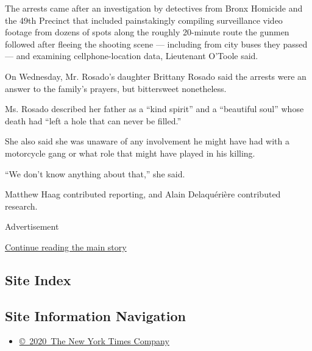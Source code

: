 The arrests came after an investigation by detectives from Bronx
Homicide and the 49th Precinct that included painstakingly compiling
surveillance video footage from dozens of spots along the roughly
20-minute route the gunmen followed after fleeing the shooting scene ---
including from city buses they passed --- and examining
cellphone-location data, Lieutenant O'Toole said.

On Wednesday, Mr. Rosado's daughter Brittany Rosado said the arrests
were an answer to the family's prayers, but bittersweet nonetheless.

Ms. Rosado described her father as a ``kind spirit'' and a ``beautiful
soul'' whose death had ``left a hole that can never be filled.''

She also said she was unaware of any involvement he might have had with
a motorcycle gang or what role that might have played in his killing.

``We don't know anything about that,'' she said.

Matthew Haag contributed reporting, and Alain Delaquérière contributed
research.

Advertisement

\protect\hyperlink{after-bottom}{Continue reading the main story}

\hypertarget{site-index}{%
\subsection{Site Index}\label{site-index}}

\hypertarget{site-information-navigation}{%
\subsection{Site Information
Navigation}\label{site-information-navigation}}

\begin{itemize}
\tightlist
\item
  \href{https://help.nytimes.com/hc/en-us/articles/115014792127-Copyright-notice}{©~2020~The
  New York Times Company}
\end{itemize}

